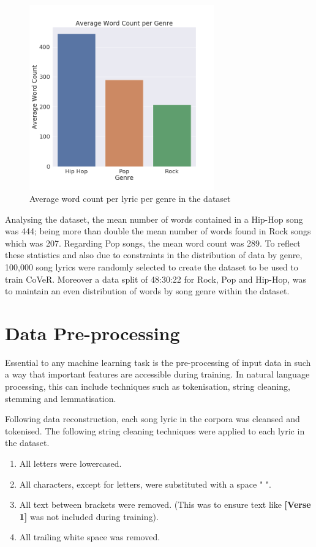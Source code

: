 \begin{figure}[h]
	\includegraphics[width=8cm, height=8cm]{./figures/fig6}
	\centering
	\caption{Average word count per lyric per genre in the dataset}
	\label{fig:fig6}
\end{figure}

\noindent
\newline
Analysing the dataset, the mean number of words contained in a Hip-Hop song was 444; being more than double the mean number of words found in Rock songs which was 207. Regarding Pop songs, the mean word count was 289. To reflect these statistics and also due to constraints in the distribution of data by genre, 100,000 song lyrics were randomly selected to create the dataset to be used to train CoVeR. Moreover a data split of 48:30:22 for Rock, Pop and Hip-Hop, was to maintain an even distribution of words by song genre within the dataset.
\section{Data Pre-processing}
Essential to any machine learning task is the pre-processing of input data in such a way that important features are accessible during training. In natural language processing, this can include techniques such as tokenisation, string cleaning, stemming and lemmatisation. 

\noindent
\newline
Following data reconstruction, each song lyric in the corpora was cleansed and tokenised. The following string cleaning techniques were applied to each lyric in the dataset.

\begin{enumerate}
	\item All letters were lowercased.
	\item All characters, except for letters, were substituted with a space " ".
	\item All text between brackets were removed. (This was to ensure text like \textbf{[Verse 1]} was not included during training).
	\item All trailing white space was removed.
\end{enumerate}


